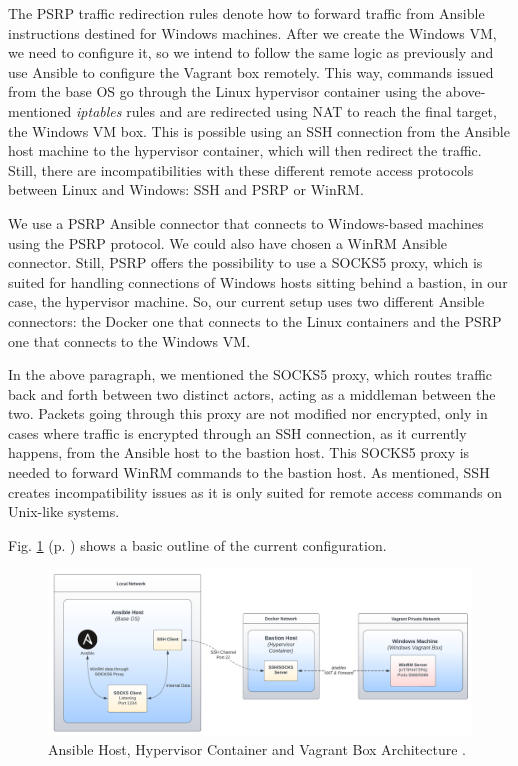 
The PSRP traffic redirection rules denote how to forward traffic from Ansible instructions destined for Windows machines. After we create the Windows VM, we need to configure it, so we intend to follow the same logic as previously and use Ansible to configure the Vagrant box remotely. This way, commands issued from the base OS go through the Linux hypervisor container using the above-mentioned \textit{iptables} rules and are redirected using NAT to reach the final target, the Windows VM box. This is possible using an SSH connection from the Ansible host machine to the hypervisor container, which will then redirect the traffic. Still, there are incompatibilities with these different remote access protocols between Linux and Windows: SSH and PSRP or WinRM. 

We use a PSRP Ansible connector that connects to Windows-based machines using the PSRP protocol. We could also have chosen a WinRM Ansible connector. Still, PSRP offers the possibility to use a SOCKS5 proxy, which is suited for handling connections of Windows hosts sitting behind a bastion, in our case, the hypervisor machine. So, our current setup uses two different Ansible connectors: the Docker one that connects to the Linux containers and the PSRP one that connects to the Windows VM.

In the above paragraph, we mentioned the SOCKS5 proxy, which routes traffic back and forth between two distinct actors, acting as a middleman between the two. Packets going through this proxy are not modified nor encrypted, only in cases where traffic is encrypted through an SSH connection, as it currently happens, from the Ansible host to the bastion host. This SOCKS5 proxy is needed to forward WinRM commands to the bastion host. As mentioned, SSH creates incompatibility issues as it is only suited for remote access commands on Unix-like systems.

Fig. \ref{fig:vagrant_kvm_host} (p. \pageref{fig:vagrant_kvm_host}) shows a basic outline of the current configuration.

\begin{figure}[H]
    \includegraphics[width=13cm]{figures/vagrant_kvm_setup.pdf}
    \caption{Ansible Host, Hypervisor Container and Vagrant Box Architecture \cite{vagrant_kvm_host_ref}.}
    \label{fig:vagrant_kvm_host}
\end{figure}

